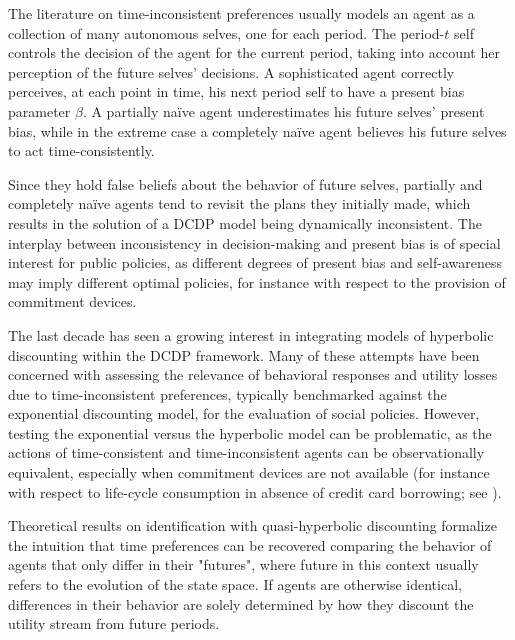 The literature on time-inconsistent preferences usually models an agent as a collection of many autonomous selves, one for each period. The period-$t$ self controls the decision of the agent for the current period, taking into account her perception of the future selves' decisions. A sophisticated agent correctly perceives, at each point in time, his next period self to have a present bias parameter $\beta$. A partially naïve agent underestimates his future selves' present bias, while in the extreme case a completely naïve agent believes his future selves to act time-consistently. 

Since they hold false beliefs about the behavior of future selves, partially and completely naïve agents tend to revisit the plans they initially made, which results in the solution of a DCDP model being dynamically inconsistent.
The interplay between inconsistency in decision-making and present bias is of special interest for public policies, as different degrees of present bias and self-awareness may imply different optimal policies, for instance with respect to the provision of commitment devices.


The last decade has seen a growing interest in integrating models of hyperbolic discounting within the DCDP framework. Many of these attempts have been concerned with assessing the relevance of behavioral responses and utility losses due to time-inconsistent preferences, typically benchmarked against the exponential discounting model, for the evaluation of social policies. However, testing the exponential versus the hyperbolic model can be problematic, as the actions of time-consistent and time-inconsistent agents can be observationally equivalent, especially when commitment devices are not available (for instance with respect to life-cycle consumption in absence of credit card borrowing; see \cite{LaibsonRepetto1998}).

Theoretical results on identification with quasi-hyperbolic discounting formalize the intuition that time preferences can be recovered comparing the behavior of agents that only differ in their "futures", where future in this context usually refers to the evolution of the state space. If agents are otherwise identical, differences in their behavior are solely determined by how they discount the utility stream from future periods.

